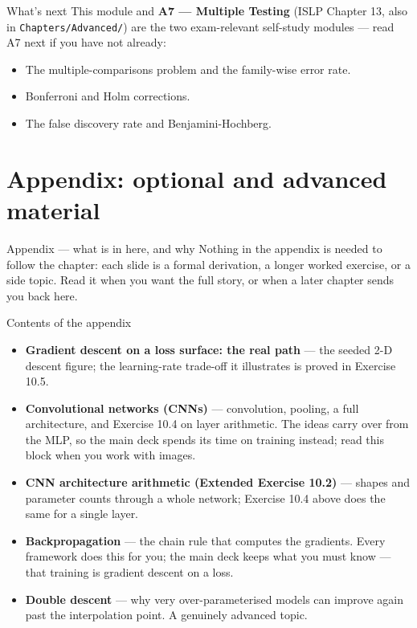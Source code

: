 \documentclass[aspectratio=169,11pt]{beamer}
\begin{document}
\begin{frame}{What's next}
  This module and \textbf{A7 --- Multiple Testing} (ISLP Chapter 13, also in
  \texttt{Chapters/Advanced/}) are the two exam-relevant self-study modules ---
  read A7 next if you have not already:
  \begin{itemize}
    \item The multiple-comparisons problem and the family-wise error rate.
    \item Bonferroni and Holm corrections.
    \item The false discovery rate and Benjamini-Hochberg.
  \end{itemize}
\end{frame}


\appendix
\AtBeginSection[]{}
\section{Appendix: optional and advanced material}

\begin{frame}{Appendix --- what is in here, and why}
  \footnotesize
  Nothing in the appendix is needed to follow the chapter: each slide is a
  formal derivation, a longer worked exercise, or a side topic. Read it when
  you want the full story, or when a later chapter sends you back here.
  \begin{block}{Contents of the appendix}
    \begin{itemize}
      \item \textbf{Gradient descent on a loss surface: the real path} --- the seeded 2-D descent figure; the learning-rate trade-off it illustrates is proved in Exercise 10.5.
      \item \textbf{Convolutional networks (CNNs)} --- convolution, pooling, a full architecture, and Exercise 10.4 on layer arithmetic. The ideas carry over from the MLP, so the main deck spends its time on training instead; read this block when you work with images.
      \item \textbf{CNN architecture arithmetic (Extended Exercise 10.2)} --- shapes and parameter counts through a whole network; Exercise 10.4 above does the same for a single layer.
      \item \textbf{Backpropagation} --- the chain rule that computes the gradients. Every framework does this for you; the main deck keeps what you must know --- that training is gradient descent on a loss.
      \item \textbf{Double descent} --- why very over-parameterised models can improve again past the interpolation point. A genuinely advanced topic.
    \end{itemize}
  \end{block}
\end{frame}
\end{document}

